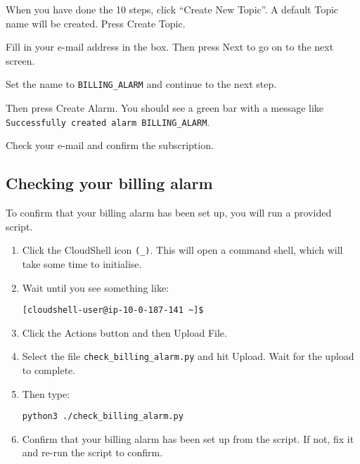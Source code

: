 When you have done the 10 steps, click ``Create New Topic''.
A default Topic name will be created.
Press Create Topic.

Fill in your e-mail address in the box.
Then press Next to go on to the next screen.

Set the name to \texttt{BILLING\_ALARM} and continue to the next step. 

Then press Create Alarm.
You should see a green bar with a message like \texttt{Successfully created alarm BILLING\_ALARM}.

Check your e-mail and confirm the subscription.

\subsection{Checking your billing alarm}

To confirm that your billing alarm has been set up, you will run a provided script.
\begin{enumerate}
\item Click the CloudShell icon \texttt{(\textrangle\_)}.
  This will open a command shell, which will take some time to initialise.

\item Wait until you see something like:
\begin{verbatim}
[cloudshell-user@ip-10-0-187-141 ~]$ 
\end{verbatim}

\item Click the Actions button and then Upload File.

\item Select the file \texttt{check\_billing\_alarm.py} and hit Upload.
  Wait for the upload to complete.

\item Then type:
\begin{verbatim}
python3 ./check_billing_alarm.py
\end{verbatim}

\item Confirm that your billing alarm has been set up from the script.
  If not, fix it and re-run the script to confirm. 

\end{enumerate}

